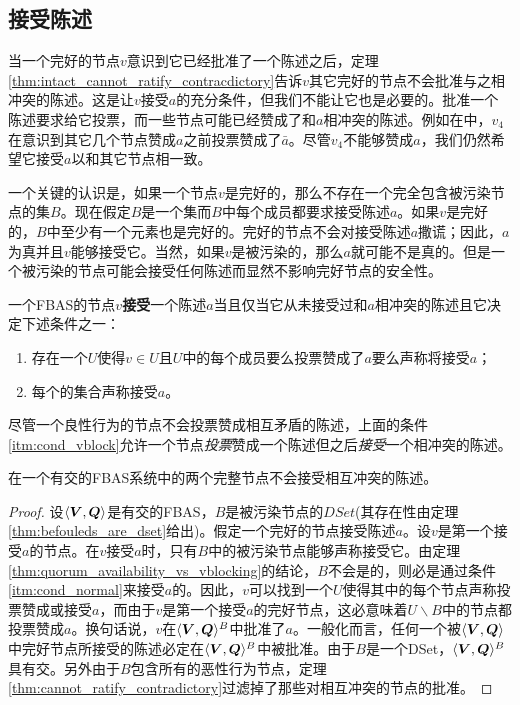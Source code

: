 \subsection{接受陈述}

当一个完好的节点$v$意识到它已经批准了一个陈述之后，定理\ref{thm:intact_cannot_ratify_contracdictory}告诉$v$其它完好的节点不会批准与之相冲突的陈述。这是让$v$接受$a$的充分条件，但我们不能让它也是必要的。批准一个陈述要求给它投票，而一些节点可能已经赞成了和$a$相冲突的陈述。例如在中，$v_4$在意识到其它几个节点赞成$a$之前投票赞成了$\bar a$。尽管$v_4$不能够赞成$a$，我们仍然希望它接受$a$以和其它节点相一致。

一个关键的认识是，如果一个节点$v$是完好的，那么不存在一个完全包含被污染节点的{\vblock}集$B$。现在假定$B$是一个{\vblock}集而$B$中每个成员都要求接受陈述$a$。如果$v$是完好的，$B$中至少有一个元素也是完好的。完好的节点不会对接受陈述$a$撒谎；因此，$a$为真并且$v$能够接受它。当然，如果$v$是被污染的，那么$a$就可能不是真的。但是一个被污染的节点可能会接受任何陈述而显然不影响完好节点的安全性。

\begin{definition}[接受]
        一个FBAS的节点$v$\textbf{接受}一个陈述$a$当且仅当它从未接受过和$a$相冲突的陈述且它决定下述条件之一：
        \begin{enumerate}
                \item\label{itm:cond_normal} 存在一个{\quorum}$U$使得$v\in U$且$U$中的每个成员要么投票赞成了$a$要么声称将接受$a$；
                \item\label{itm:cond_vblock} 每个{\vblock}的集合声称接受$a$。 
        \end{enumerate}
\end{definition}

尽管一个良性行为的节点不会投票赞成相互矛盾的陈述，上面的条件\ref{itm:cond_vblock}允许一个节点\textit{投票}赞成一个陈述但之后\textit{接受}一个相冲突的陈述。

\begin{theorem}\label{thm:intact_cannot_accept_contradictory}
        在一个有{\quorum}交的FBAS系统中的两个完整节点不会接受相互冲突的陈述。
\end{theorem}

\begin{proof}
        设$\langle{\bm V},{\bm Q}\rangle$是有{\quorum}交的FBAS，$B$是被污染节点的$DSet$(其存在性由定理\ref{thm:befouleds_are_dset}给出)。假定一个完好的节点接受陈述$a$。设$v$是第一个接受$a$的节点。在$v$接受$a$时，只有$B$中的被污染节点能够声称接受它。由定理\ref{thm:quorum_availability_vs_vblocking}的结论，$B$不会是{\vblock}的，则必是通过条件\ref{itm:cond_normal}来接受$a$的。因此，$v$可以找到一个{\quorum}$U$使得其中的每个节点声称投票赞成或接受$a$，而由于$v$是第一个接受$a$的完好节点，这必意味着$U\backslash B$中的节点都投票赞成$a$。换句话说，$v$在$\langle{\bm V},{\bm Q}\rangle^{B}$中批准了$a$。一般化而言，任何一个被$\langle{\bm V},{\bm Q}\rangle$中完好节点所接受的陈述必定在$\langle{\bm V},{\bm Q}\rangle^{B}$中被批准。由于$B$是一个DSet，$\langle{\bm V},{\bm Q}\rangle^{B}$具有{\quorum}交。另外由于$B$包含所有的恶性行为节点，定理\ref{thm:cannot_ratify_contradictory}过滤掉了那些对相互冲突的节点的批准。
\end{proof}